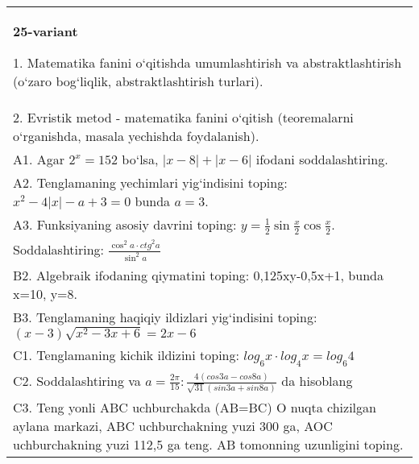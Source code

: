 \documentclass{article}
\begin{document}
\begin{tabular}{m{17cm}}
\textbf{25-variant}

1. Matematika fanini o‘qitishda umumlashtirish va abstraktlashtirish (o‘zaro bog‘liqlik, abstraktlashtirish turlari). \\
2. Evristik metod - matematika fanini o‘qitish (teoremalarni o‘rganishda, masala yechishda foydalanish). \\
A1. Agar \(2^{x} = 152\) bo‘lsa, \(|x - 8| + |x - 6|\) ifodani soddalashtiring. \\
A2. Tenglamaning yechimlari yig‘indisini toping: \(x^2 - 4|x| - a + 3 = 0\) bunda \(a = 3\). \\
A3. Funksiyaning asosiy davrini toping: \(y = \frac{1}{2}\sin{\frac{x}{2}\cos\frac{x}{2}}\). \\
Soddalashtiring: \(\frac{\cos^{2}a \cdot {ctg}^{2}a}{\sin^{2}a}\) \\
B2. Algebraik ifodaning qiymatini toping: 0,125xy-0,5x+1, bunda x=10, y=8. \\
B3. Tenglamaning haqiqiy ildizlari yig‘indisini toping: \((x-3) \sqrt{x^{2} - 3x + 6} = 2x - 6\) \\
C1. Tenglamaning kichik ildizini toping: \(log_{6}x \cdot log_{4}x = log_{6}4\) \\
C2. Soddalashtiring va \(a = \frac{2\pi}{15}:\frac{4 (cos3a - cos8a) }{\sqrt{31} (sin3a + sin8a) }\) da hisoblang \\
C3. Teng yonli ABC uchburchakda (AB=BC) O nuqta chizilgan aylana markazi, ABC uchburchakning yuzi 300 ga, AOC uchburchakning yuzi 112,5 ga teng. AB tomonning uzunligini toping. \\

\end{tabular}
\vspace{1cm}
\end{document}
